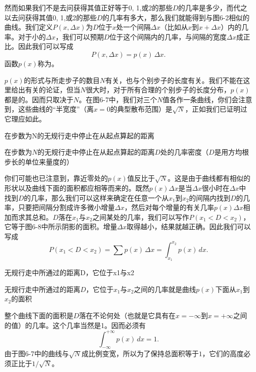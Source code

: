 \documentclass[12pt,oneside]{book}
\begin{document}
然而如果我们不是去问获得其值正好等于0, 1,或2的那些$D$的几率是多少，而代之以去问获得其值0, 1,或2的那些$D$的几率有多大，那么我们就能得到与图6-2相似的曲线。我们定义$P(x,\Delta x)$为$D$位于$x$处一个间隔$\Delta x$（比如从$x$到$x+\Delta x$）内的几率。对于小的$\Delta x$，我们可以预期$D$位于这个间隔内的几率，与间隔的宽度$\Delta x$成正比。因此我们可以写成
\begin{equation}
\label{Eq:I:6:17}
P(x,\Delta x)=p(x)\,\Delta x.
\end{equation}
函数$p(x)$称为。

$p(x)$的形式与所走步子的数目$N$有关，也与个别步子的长度有关。我们不能在这里给出有关的论证，但当$N$很大时，对于所有合理的个别步子的长度分布，$p(x)$都是的。因而只取决于$N$。在图6-7中，我们对三个$N$值各作一条曲线，你们会注意到，这些曲线的“半宽度”（离$x=0$的典型散布范围）是$\sqrt{N}$，正如我们已证明过它理应如此。
\begin{linefig}{在步数为N的无规行走中停止在从起点算起的距离}
\caption{\footnotesize 在步数为$N$的无规行走中停止在从起点算起的距离$D$处的几率密度（$D$是用方均根步长的单位来量度的）}
\label{fig:在步数为N的无规行走中停止在从起点算起的距离}
\end{linefig}

你们可能也已注意到，靠近零处的$p(x)$值反比于$\sqrt{N}$。这是由于曲线都有相似的形状以及曲线下面的面积都应相等而来的。既然$p(x)\Delta x$是当$\Delta x$很小时在$\Delta x$中找到$D$的几率，那么我们可以这样来确定在任意一个从$x_1$到$x_2$的间隔内找到$D$的几率，只要把间隔分割成许多微小增量$\Delta x$，然后对每个增量的有关几率$p(x)\Delta x$相加而求其总和。$D$落在$x_1$与$x_2$之间某处的几率，我们可以写作$P(x_1 < D < x_2)$，它等于图6-8中所示阴影的面积。增量$\Delta x$取得越小，结果就越正确。因此我们可以写成
\begin{equation}
\label{Eq:I:6:18}
P(x_1 < D < x_2)=\sum p(x)\,\Delta x=\int_{x_1}^{x_2}p(x)\,dx.
\end{equation}
\begin{fig}{无规行走中所通过的距离D，它位于x1与x2}
\caption{\footnotesize 无规行走中所通过的距离$D$，它位于$x_1$与$x_2$之间的几率就是曲线$p(x)$下面从$x_1$到$x_2$的面积}
\label{fig:无规行走中所通过的距离D，它位于x1与x2}
\end{fig}

整个曲线下面的面积是$D$落在不论何处（也就是它具有在$x=-\infty$到$x=+\infty$之间的值）的几率。这个几率当然是1。因而必须有
\begin{equation}
\label{Eq:I:6:19}
\int_{-\infty}^{+\infty}p(x)\,dx=1.
\end{equation}
由于图6-7中的曲线与$\sqrt{N}$成比例变宽，所以为了保持总面积等于$1$，它们的高度必须正比于$1/\sqrt{N}$。
\end{document}
